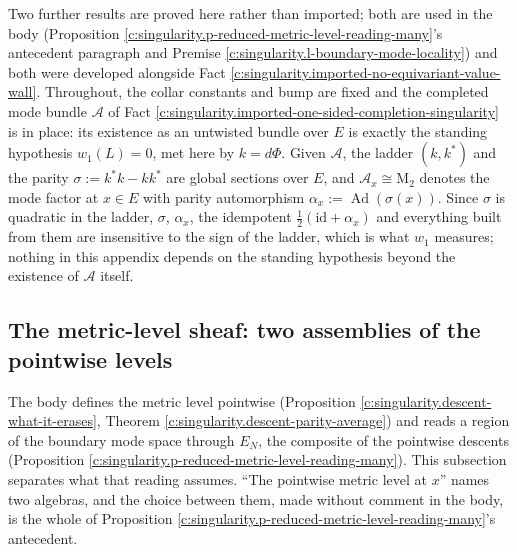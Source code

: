 \documentclass[11pt]{article}
\theoremstyle{definition}
\theoremstyle{plain}
\providecommand{\Aa}{}\renewcommand{\Aa}{\mathcal{A}}
\providecommand{\EN}{}\renewcommand{\EN}{E_{N}}
\providecommand{\Mat}{}\renewcommand{\Mat}{\mathrm{M}}
\providecommand{\id}{}\renewcommand{\id}{\mathrm{id}}
\providecommand{\shL}{}\renewcommand{\shL}{L}
\begin{document}
\label{c:note.singularity.setting-metric-level-sheaf-hopping-exclusion}
Two further results are proved here rather than imported; both are used in the body (Proposition \ref{c:singularity.p-reduced-metric-level-reading-many}'s antecedent paragraph and Premise \ref{c:singularity.l-boundary-mode-locality}) and both were developed alongside Fact \ref{c:singularity.imported-no-equivariant-value-wall}. Throughout, the collar constants and bump are fixed and the completed mode bundle $\Aa$ of Fact \ref{c:singularity.imported-one-sided-completion-singularity} is in place: its existence as an untwisted bundle over $E$ is exactly the standing hypothesis $w_1(\shL) = 0$, met here by $k = d\Phi$. Given $\Aa$, the ladder $(k, k^{*})$ and the parity $\sigma := k^{*}k - kk^{*}$ are global sections over $E$, and $\Aa_x \cong \Mat_2$ denotes the mode factor at $x \in E$ with parity automorphism $\alpha_x := \operatorname{Ad}(\sigma(x))$. Since $\sigma$ is quadratic in the ladder, $\sigma$, $\alpha_x$, the idempotent $\tfrac12(\id + \alpha_x)$ and everything built from them are insensitive to the sign of the ladder, which is what $w_1$ measures; nothing in this appendix depends on the standing hypothesis beyond the existence of $\Aa$ itself.

\subsection*{The metric-level sheaf: two assemblies of the pointwise levels}
\label{c:note.singularity.setting-metric-level-sheaf-two-assemblies}
The body defines the metric level pointwise (Proposition \ref{c:singularity.descent-what-it-erases}, Theorem \ref{c:singularity.descent-parity-average}) and reads a region of the boundary mode space through $\EN$, the composite of the pointwise descents (Proposition \ref{c:singularity.p-reduced-metric-level-reading-many}). This subsection separates what that reading assumes. ``The pointwise metric level at $x$'' names two algebras, and the choice between them, made without comment in the body, is the whole of Proposition \ref{c:singularity.p-reduced-metric-level-reading-many}'s antecedent.
\end{document}
